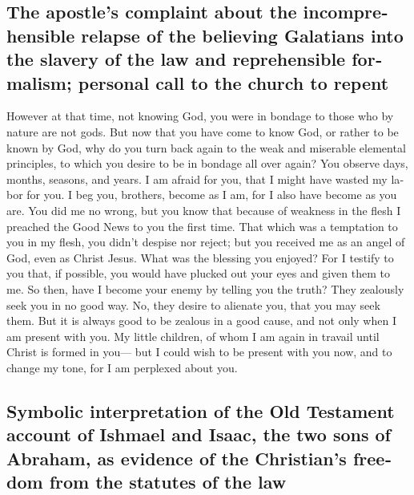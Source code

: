 \begin{paracol}{2}
\begin{otherlanguage}{english}
\hypertarget{the-apostles-complaint-about-the-incomprehensible-relapse-of-the-believing-galatians-into-the-slavery-of-the-law-and-reprehensible-formalism-personal-call-to-the-church-to-repent}{%
\subsection{The apostle's complaint about the incomprehensible relapse
of the believing Galatians into the slavery of the law and reprehensible
formalism; personal call to the church to
repent}\label{the-apostles-complaint-about-the-incomprehensible-relapse-of-the-believing-galatians-into-the-slavery-of-the-law-and-reprehensible-formalism-personal-call-to-the-church-to-repent}}

 However at that time, not knowing God, you were in
bondage to those who by nature are not gods.  But now that
you have come to know God, or rather to be known by God, why do you turn
back again to the weak and miserable elemental principles, to which you
desire to be in bondage all over again?  You observe
days, months, seasons, and years.  I am afraid for you,
that I might have wasted my labor for you.  I beg you,
brothers, become as I am, for I also have become as you are. You did me
no wrong,  but you know that because of weakness in the
flesh I preached the Good News to you the first time. 
That which was a temptation to you in my flesh, you didn't despise nor
reject; but you received me as an angel of God, even as Christ Jesus.
 What was the blessing you enjoyed? For I testify to you
that, if possible, you would have plucked out your eyes and given them
to me.  So then, have I become your enemy by telling you
the truth?  They zealously seek you in no good way. No,
they desire to alienate you, that you may seek them.  But
it is always good to be zealous in a good cause, and not only when I am
present with you.  My little children, of whom I am again
in travail until Christ is formed in you---  but I could
wish to be present with you now, and to change my tone, for I am
perplexed about you.

\hypertarget{symbolic-interpretation-of-the-old-testament-account-of-ishmael-and-isaac-the-two-sons-of-abraham-as-evidence-of-the-christians-freedom-from-the-statutes-of-the-law}{%
\subsection{Symbolic interpretation of the Old Testament account of
Ishmael and Isaac, the two sons of Abraham, as evidence of the
Christian's freedom from the statutes of the
law}\label{symbolic-interpretation-of-the-old-testament-account-of-ishmael-and-isaac-the-two-sons-of-abraham-as-evidence-of-the-christians-freedom-from-the-statutes-of-the-law}}


\end{otherlanguage}
\end{paracol}
